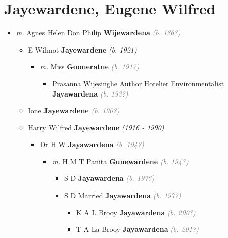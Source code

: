 \documentclass[10pt, openany]{book}
\begin{document}
\chapter{Jayewardene, Eugene Wilfred}
\label{00002587}
\textcolor{slmaroon}{\textit{}}
\begin{itemize}
\item{\textit{m.} Agnes Helen Don Philip \textbf{Wijewardena} \textcolor{gray}{\textit{(b. 186?)}}   \label{couple:00002587:00002588} \begin{itemize}
\item{E Wilmot \textbf{Jayewardene} \textcolor{slorange}{\textit{(b. 1921)}}
\begin{itemize}
\item{\textit{m.} Miss \textbf{Gooneratne} \textcolor{gray}{\textit{(b. 191?)}}   \label{couple:00002590:00003463} \begin{itemize}
\item{Prasanna Wijesinghe Author Hotelier Environmentalist \textbf{Jayawardena} \textcolor{gray}{\textit{(b. 193?)}}
     }
\end{itemize}}
\end{itemize}
  }
\item{Ione \textbf{Jayewardene} \textcolor{gray}{\textit{(b. 190?)}}
 }
\item{Harry Wilfred \textbf{Jayewardene} \textcolor{slorange}{\textit{(1916 - 1990)}}
\begin{itemize}
\item{Dr H W \textbf{Jayawardena} \textcolor{gray}{\textit{(b. 194?)}}
\begin{itemize}
\item{\textit{m.} H M T Panita \textbf{Gunewardene} \textcolor{gray}{\textit{(b. 194?)}}   \label{couple:00003469:00003470} \begin{itemize}
\item{S D \textbf{Jayawardena} \textcolor{gray}{\textit{(b. 197?)}}
  }
\item{S D Married \textbf{Jayawardena} \textcolor{gray}{\textit{(b. 197?)}}
\begin{itemize}
\item{K A L Brooy \textbf{Jayawardena} \textcolor{gray}{\textit{(b. 200?)}}
    }
\item{T A La Brooy \textbf{Jayawardena} \textcolor{gray}{\textit{(b. 201?)}}
}
\end{itemize}}
\end{itemize}}
\end{itemize}}
\end{itemize}}
\end{itemize}}
\end{itemize}
\end{document}
